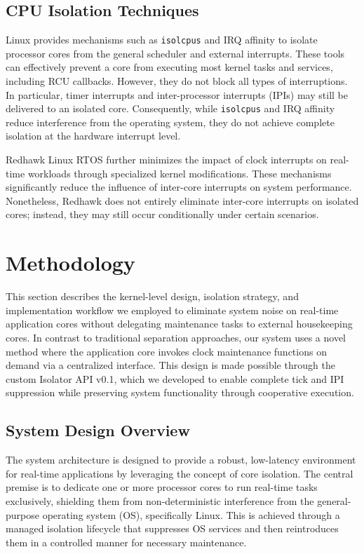 \documentclass[letterpaper]{article}
\begin{document}
\subsection{CPU Isolation Techniques}

Linux provides mechanisms such as \texttt{isolcpus} and IRQ affinity \cite{KernelDocParam} 
to isolate processor cores from the general scheduler and external interrupts. 
These tools can effectively prevent a core from executing most kernel tasks and services, 
including RCU callbacks. However, they do not block all types of interruptions. 
In particular, timer interrupts and inter-processor interrupts (IPIs) may still be delivered 
to an isolated core. Consequently, while \texttt{isolcpus} and IRQ affinity reduce interference 
from the operating system, they do not achieve complete isolation at the hardware interrupt level.  

Redhawk Linux RTOS \cite{redhawk} further minimizes the impact of clock interrupts on real-time workloads 
through specialized kernel modifications. These mechanisms significantly reduce the influence 
of inter-core interrupts on system performance. Nonetheless, Redhawk does not entirely eliminate 
inter-core interrupts on isolated cores; instead, they may still occur conditionally under certain scenarios.


\section{Methodology}\label{BE}

This section describes the kernel-level design, isolation strategy, and implementation workflow we employed
to eliminate system noise on real-time application cores without delegating maintenance tasks to external
housekeeping cores. In contrast to traditional separation approaches, our system uses a novel method
where the application core invokes clock maintenance functions on demand via a centralized interface.
This design is made possible through the custom Isolator API v0.1, which we developed to enable complete
tick and IPI suppression while preserving system functionality through cooperative execution.

\subsection{System Design Overview}
\label{subsec:system-design}

The system architecture is designed to provide a robust, low-latency environment for real-time applications by leveraging the concept of core isolation. The central premise is to dedicate one or more processor cores to run real-time tasks exclusively, shielding them from non-deterministic interference from the general-purpose operating system (OS), specifically Linux. This is achieved through a managed isolation lifecycle that suppresses OS services and then reintroduces them in a controlled manner for necessary maintenance.
\end{document}
